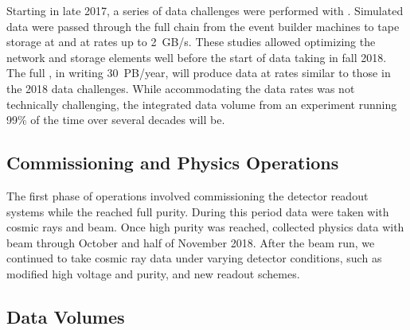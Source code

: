 Starting in late 2017, a series of data challenges were performed with .  Simulated data were passed through the full chain from the event builder machines to tape storage at  and  at rates up to \SI{2}{GB/s}.  These studies allowed optimizing the network and storage elements well before the start of data taking in fall 2018. 
The full  , in writing \SI{30}{PB/year}, will produce data at rates similar to  those in the 2018 data challenges. While accommodating the  data rates %
was not technically challenging, the integrated data volume from an experiment running 99\% of the time over several decades will be. 

\subsection{Commissioning and Physics Operations}

The first phase of operations involved commissioning the detector readout systems while the  reached full purity.  During this period data were taken with cosmic rays and beam. Once high  purity was reached,  collected physics data with beam through October and half of November 2018. %
After the beam run, we continued to take cosmic ray data under varying detector conditions, such as modified high voltage and purity, and new readout schemes. 

\subsection{Data Volumes}

